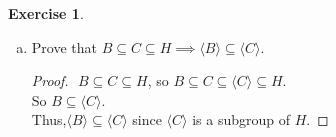 \documentclass{amsart}
\theoremstyle{plain}
\theoremstyle{definition}
\newtheorem{exer}[lem]{Exercise}
\begin{document}
\begin{exer}
\begin{enumerate}[(a)]
\begin{proof}
		Then
		\begin{align*}
			f(x) &= f(a_1^{\epsilon_1}a_2^{\epsilon_2}...a_n^{\epsilon_n}) \\
				 	  &= {f(a_1)}^{\epsilon_1} {f(a_2)}^{\epsilon_2}...{f(a_n)}^{\epsilon_n}\\
				 	  & \in f(A) \subseteq \langle f(A)\rangle
		\end{align*}
		since $f$ is a homomorphism and $f(a_1)^{\epsilon_1},f(a_2)^{\epsilon_2},...,f(a_n)^{\epsilon_n} \in f(A)$.\\
		So we have 
		$$f(\langle A \rangle) \subseteq \langle f(A)\rangle.$$
		Since both of $f(\langle A\rangle)$ and $\langle f(A) \rangle$ are subgroups of $H$,\\
		$f(\langle A\rangle)=\langle f(A)\rangle$
	\end{proof}
\item Prove that $B\subseteq C\subseteq H\implies \langle B\rangle\subseteq\langle C\rangle$.
	\begin{proof}
		$ $\newline
		$B \subseteq C \subseteq H$, so $B\subseteq C \subseteq \langle C \rangle \subseteq H$.\\
		So $B\subseteq \langle C \rangle$.\\
		Thus,$\langle B \rangle \subseteq \langle C \rangle$ since $\langle C \rangle$ is a subgroup of $H$.
	\end{proof}


\end{enumerate}
\end{exer}
\end{document}
